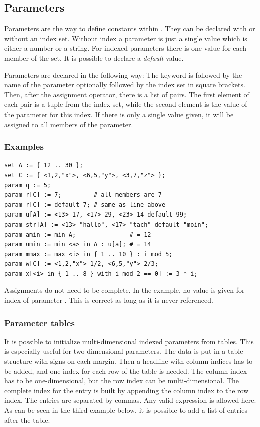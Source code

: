 \subsection{Parameters}
\label{ssec:parameters}

Parameters are the way to define constants within \zimpl. They can be
declared with or without an index set. Without index a parameter is
just a single value which is either a number or a string. For indexed
parameters there is one value for each member of the set. It is
possible to declare a \emph{default} value.

Parameters are declared in the following way:
The keyword  is followed by the name of the parameter
optionally followed by the index set in square brackets.
Then, after the assignment operator, there is a list of pairs. The first element of each
pair is a tuple from the index set, while the second element is the value of
the parameter for this index. If there is only a single value given,
it will be assigned to all members of the parameter.

\subsubsection{Examples}
{\small
\begin{verbatim}
set A := { 12 .. 30 };
set C := { <1,2,"x">, <6,5,"y">, <3,7,"z"> };
param q := 5;
param r[C] := 7;         # all members are 7
param r[C] := default 7; # same as line above
param u[A] := <13> 17, <17> 29, <23> 14 default 99;
param str[A] := <13> "hallo", <17> "tach" default "moin";
param amin := min A;               # = 12
param umin := min <a> in A : u[a]; # = 14
param mmax := max <i> in { 1 .. 10 } : i mod 5;
param w[C] := <1,2,"x"> 1/2, <6,5,"y"> 2/3;
param x[<i> in { 1 .. 8 } with i mod 2 == 0] := 3 * i;
\end{verbatim}
}
\noindent
Assignments do not need to be complete.  In the example, no value is
given for index  of parameter . This is
correct as long as it is never referenced.

\subsubsection{Parameter tables}
It is possible to initialize multi-dimensional indexed parameters from
tables. This is especially useful for two-dimensional parameters.
The data is put in a table structure with \code{$|$} signs on each
margin. Then a headline with column indices has to be added, and one index
for each row of the table is needed. The column index has to be
one-dimensional, but the row index can be
multi-dimensional. The complete index for the entry is built by
appending the column index to the row index.
The entries are separated by commas. Any valid expression is
allowed here. As can be seen in the third example below, it is
possible to add a list of entries after the table.



